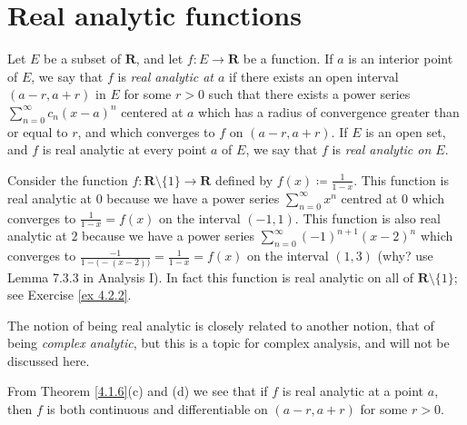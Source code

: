 \section{Real analytic functions}\label{sec 4.2}

\begin{definition}\label{4.2.1}
    Let \(E\) be a subset of \(\mathbf{R}\), and let \(f : E \to \mathbf{R}\) be a function.
    If \(a\) is an interior point of \(E\), we say that \(f\) is \emph{real analytic at \(a\)} if there exists an open interval \((a - r, a + r)\) in \(E\) for some \(r > 0\) such that there exists a power series \(\sum_{n = 0}^\infty c_n (x - a)^n\) centered at \(a\) which has a radius of convergence greater than or equal to \(r\), and which converges to \(f\) on \((a - r, a + r)\).
    If \(E\) is an open set, and \(f\) is real analytic at every point \(a\) of \(E\), we say that \(f\) is \emph{real analytic on \(E\)}.
\end{definition}

\begin{example}\label{4.2.2}
    Consider the function \(f : \mathbf{R} \setminus \{1\} \to \mathbf{R}\) defined by \(f(x) \coloneqq \frac{1}{1 - x}\).
    This function is real analytic at \(0\) because we have a power series \(\sum_{n = 0}^\infty x^n\) centred at \(0\) which converges to \(\frac{1}{1 - x} = f(x)\) on the interval \((-1, 1)\).
    This function is also real analytic at \(2\) because we have a power series \(\sum_{n = 0}^\infty (-1)^{n + 1} (x - 2)^n\) which converges to \(\frac{-1}{1 - \big(-(x - 2)\big)} = \frac{1}{1 - x} = f(x)\) on the interval \((1, 3)\)
    (why? use Lemma 7.3.3 in Analysis I).
    In fact this function is real analytic on all of \(\mathbf{R} \setminus \{1\}\);
    see Exercise \ref{ex 4.2.2}.
\end{example}

\begin{remark}\label{4.2.3}
    The notion of being real analytic is closely related to another notion, that of being \emph{complex analytic}, but this is a topic for complex analysis, and will not be discussed here.
\end{remark}

\begin{note}
    From Theorem \ref{4.1.6}(c) and (d) we see that if \(f\) is real analytic at a point \(a\), then \(f\) is both continuous and diﬀerentiable on \((a - r, a + r)\) for some \(r > 0\).
\end{note}

